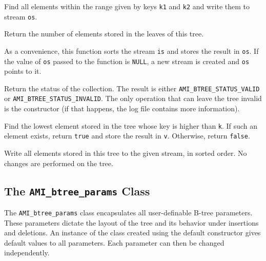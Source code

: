     {Find all elements within the range given by
   keys \lstinline|k1| and \lstinline|k2| and write them to stream \lstinline|os|.}


    {Return the number of elements
   stored in the leaves of this tree.}

    {As a convenience, this function sorts the
   stream \lstinline|is| and stores the result in \lstinline|os|. If the value of \lstinline|os| passed to the function is \lstinline|NULL|, a new stream is created and
   \lstinline|os| points to it.}

    {Return the status
   of the collection. The result is either
   \lstinline|AMI_BTREE_STATUS_VALID| or
   \lstinline|AMI_BTREE_STATUS_INVALID|. The only operation that can leave
   the tree invalid is the constructor (if that happens, the log file
   contains more information).}

    {Find the lowest
   element stored in the tree whose key is higher than \lstinline|k|. If such
   an element exists, return \lstinline|true| and store the result in
   \lstinline|v|. Otherwise, return \lstinline|false|.}

    {Write all
   elements stored in this tree to the given stream, in sorted order. No
   changes are performed on the tree.}

\etabb

\subsection{The \texttt{AMI\_btree\_params} Class}\label{ssec:params}
The \lstinline|AMI_btree_params| class encapsulates all user-definable B-tree
parameters. These parameters dictate the layout of the tree and its
behavior under insertions and deletions. An instance of the class created
using the default constructor gives default values to all parameters. Each
parameter can then be changed independently.

